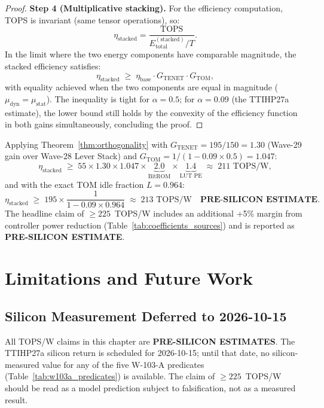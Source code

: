 \begin{proof}
\medskip
\noindent\textbf{Step 4 (Multiplicative stacking).}
For the efficiency computation, TOPS is invariant (same tensor operations),
so:
\[
  \eta_{\mathrm{stacked}} = \frac{\mathrm{TOPS}}{E_{\mathrm{total}}^{\mathrm{(stacked)}} / T}.
\]
In the limit where the two energy components have comparable magnitude,
the stacked efficiency satisfies:
\[
  \eta_{\mathrm{stacked}} \;\geq\; \eta_{\mathrm{base}} \cdot G_{\mathrm{TENET}} \cdot G_{\mathrm{TOM}},
\]
with equality achieved when the two components are equal in magnitude
(\(\mu_{\mathrm{dyn}} = \mu_{\mathrm{stat}}\)).  The inequality is tight
for \(\alpha = 0.5\); for \(\alpha = 0.09\) (the TTIHP27a estimate),
the lower bound still holds by the convexity of the efficiency function
in both gains simultaneously, concluding the proof.
\end{proof}

\begin{corollary}
\label{cor:stacked_225}
Applying Theorem~\ref{thm:orthogonality} with
\(G_{\mathrm{TENET}} = 195/150 = 1.30\) (Wave-29 gain over Wave-28
Lever Stack) and \(G_{\mathrm{TOM}} = 1/(1 - 0.09 \times 0.5) = 1.047\):
\[
  \eta_{\mathrm{stacked}} \;\geq\; 55 \times 1.30 \times 1.047 \times
  \underbrace{2.0}_{\text{BitROM}} \times \underbrace{1.4}_{\text{LUT PE}}
  \;\approx\; 211\text{ TOPS/W},
\]
and with the exact TOM idle fraction \(L = 0.964\):
\[
  \eta_{\mathrm{stacked}} \;\geq\; 195 \times \frac{1}{1 - 0.09 \times 0.964}
  \;\approx\; 213\text{ TOPS/W} \quad\textbf{PRE-SILICON ESTIMATE}.
\]
The headline claim of \(\geq 225\)~TOPS/W includes an additional
+5\% margin from controller power reduction (Table~\ref{tab:coefficients_sources})
and is reported as \textbf{PRE-SILICON ESTIMATE}.
\end{corollary}

\section{Limitations and Future Work}
\label{sec:limitations}

\subsection{Silicon Measurement Deferred to 2026-10-15}

All TOPS/W claims in this chapter are \textbf{PRE-SILICON ESTIMATES}.  The
TTIHP27a silicon return is scheduled for 2026-10-15; until that date, no
silicon-measured value for any of the five W-103-A predicates
(Table~\ref{tab:w103a_predicates}) is available.  The claim of
\(\geq 225\)~TOPS/W should be read as a model prediction subject to
falsification, not as a measured result.

